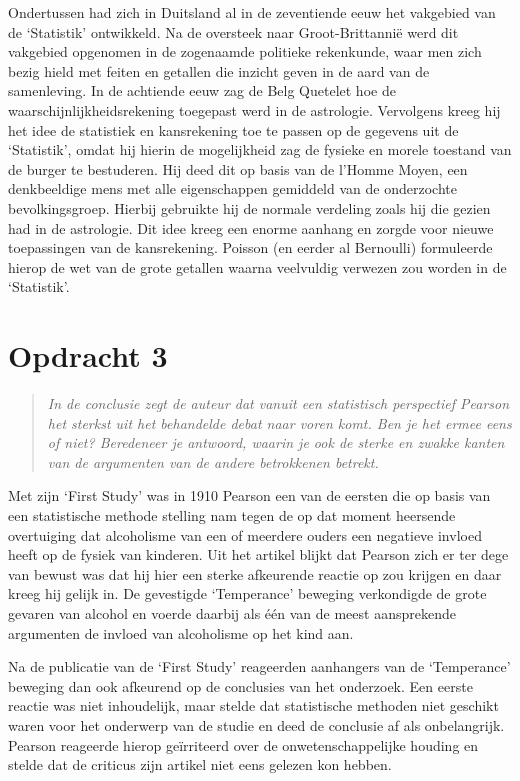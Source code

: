 \documentclass[a4paper,11pt]{article}
\begin{document}
Ondertussen had zich in Duitsland al in de zeventiende eeuw het vakgebied van
de `Statistik' ontwikkeld. Na de oversteek naar Groot-Brittanni\"e werd dit
vakgebied opgenomen in de zogenaamde politieke rekenkunde, waar men zich bezig
hield met feiten en getallen die inzicht geven in de aard van de
samenleving. In de achtiende eeuw zag de Belg Quetelet hoe de
waarschijnlijkheidsrekening toegepast werd in de astrologie. Vervolgens kreeg
hij het idee de statistiek en kansrekening toe te passen op de gegevens uit de
`Statistik', omdat hij hierin de mogelijkheid zag de fysieke en morele
toestand van de burger te bestuderen. Hij deed dit op basis van de l'Homme
Moyen, een denkbeeldige mens met alle eigenschappen gemiddeld van de
onderzochte bevolkingsgroep. Hierbij gebruikte hij de normale verdeling zoals
hij die gezien had in de astrologie. Dit idee kreeg een enorme aanhang en
zorgde voor nieuwe toepassingen van de kansrekening. Poisson (en eerder al
Bernoulli) formuleerde hierop de wet van de grote getallen waarna veelvuldig
verwezen zou worden in de `Statistik'.


\section*{Opdracht 3}


\begin{quote}
\emph{In de conclusie zegt de auteur dat vanuit een statistisch perspectief
  Pearson het sterkst uit het behandelde debat naar voren komt. Ben je het
  ermee eens of niet? Beredeneer je antwoord, waarin je ook de sterke en
  zwakke kanten van de argumenten van de andere betrokkenen betrekt.}
\end{quote}


Met zijn `First Study' was in 1910 Pearson een van de eersten die op basis
van een statistische methode stelling nam tegen de op dat moment heersende
overtuiging dat alcoholisme van een of meerdere ouders een negatieve invloed
heeft op de fysiek van kinderen. Uit het artikel blijkt dat Pearson zich er
ter dege van bewust was dat hij hier een sterke afkeurende reactie op zou
krijgen en daar kreeg hij gelijk in. De gevestigde `Temperance' beweging
verkondigde de grote gevaren van alcohol en voerde daarbij als \'e\'en van de
meest aansprekende argumenten de invloed van alcoholisme op het kind aan.

Na de publicatie van de `First Study' reageerden aanhangers van de
`Temperance' beweging dan ook afkeurend op de conclusies van het
onderzoek. Een eerste reactie was niet inhoudelijk, maar stelde dat
statistische methoden niet geschikt waren voor het onderwerp van de studie en
deed de conclusie af als onbelangrijk. Pearson reageerde hierop ge\"irriteerd
over de onwetenschappelijke houding en stelde dat de criticus zijn artikel
niet eens gelezen kon hebben.
\end{document}
